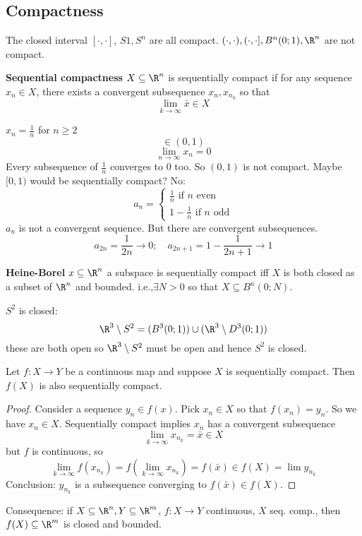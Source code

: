 \subsection*{Compactness}
\begin{example}
  The closed interval $[\cdot,\cdot]$, $S1,S^n$ are all compact. $(\cdot,\cdot), (\cdot,\cdot], B^n(0;1), \R^n$ are not compact.
\end{example}
  \begin{definition}
    \textbf{Sequential compactness}
    \newline
    $X\subseteq \R^n$ is sequentially compact if for any sequence $x_n\in X$, there exists a convergent subsequence $x_n, x_{n_k}$ so that
      $$\lim_{k\to \infty}\bar{x}\in X$$
  \end{definition}
\begin{example}
  $x_n=\frac{1}{n}$ for $n\geq 2$
  $$\in (0,1)$$
  $$\lim_{n\to \infty}x_n=0$$
  Every subsequence of $\frac{1}{n}$ converges to $0$ too. So $(0,1)$ is not compact.
  \newline
  Maybe $[0,1)$ would be sequentially compact? No:
  $$a_n=
    \begin{cases}
        \frac{1}{n} \text{ if }n \text{ even} \\
        1-\frac{1}{n} \text{ if }n \text{ odd}
    \end{cases}
  $$
$a_n$ is not a convergent sequence. But there are convergent subsequences.
  $$a_{2n}=\frac{1}{2n}\to 0; \quad a_{2n+1}=1-\frac{1}{2n+1}\to 1$$
\end{example}

\begin{theorem}
  \textbf{Heine-Borel}
  \newline
  $x\subseteq \R^n$ a subspace is sequentially compact iff $X$ is both closed as a subset of $\R^n$ and bounded.
    i.e.,$\exists N>0$ so that $X\subseteq B^n(0;N)$.
\end{theorem}

$S^2$ is closed:
$$\R^3\setminus S^2 = (B^3(0;1))\cup (\R^3\setminus D^3(0;1))$$
these are both open so $\R^3\setminus S^2$ must be open and hence $S^2$ is closed.

\begin{proposition}
  Let $f: X\to Y$ be a continuous map and suppose $X$ is sequentially compact. Then $f(X)$ is also sequentially compact.
\end{proposition}
\begin{proof}
  Consider a sequence $y_n\in f(x)$. Pick $x_n \in X$ so that $f(x_n)=y_n$. So we have $x_n\in X$.
  \newline
  Sequentially compact implies $x_n$ has a convergent subsequence
    $$ \lim_{k\to \infty}x_{n_k}=\bar{x}\in X$$
  but $f$ is continuous, so
    $$\lim_{k\to \infty}f(x_{n_k})=f(\lim_{k\to \infty}x_{n_k})=f(\bar{x})\in f(X)=\lim y_{n_k}$$
  Conclusion: $y_{n_k}$ is a subsequence converging to $f(\bar{x})\in f(X)$.
\end{proof}
Consequence: if $X\subseteq \R^n, Y\subseteq\R^m$, $f:X\to Y$ continuous, $X$ seq. comp., then $f(X)\subseteq \R^m$ is closed and bounded.

